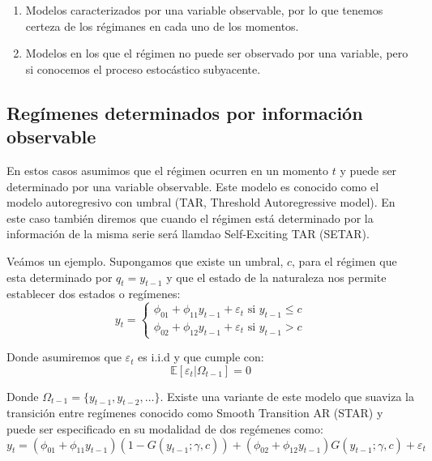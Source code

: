 \documentclass[
]{book}
\begin{document}
\begin{enumerate}
    \item Modelos caracterizados por una variable observable, por lo que tenemos certeza de los régimanes en cada uno de los momentos.
    
    \item Modelos en los que el régimen no puede ser observado por una variable, pero si conocemos el proceso estocástico subyacente. 
\end{enumerate}

\hypertarget{reguxedmenes-determinados-por-informaciuxf3n-observable}{%
\subsection{Regímenes determinados por información observable}\label{reguxedmenes-determinados-por-informaciuxf3n-observable}}

En estos casos asumimos que el régimen ocurren en un momento \(t\) y puede ser determinado por una variable observable. Este modelo es conocido como el modelo autoregresivo con umbral (TAR, Threshold Autoregressive model). En este caso también diremos que cuando el régimen está determinado por la información de la misma serie será llamdao Self-Exciting TAR (SETAR).

Veámos un ejemplo. Supongamos que existe un umbral, \(c\), para el régimen que esta determinado por \(q_t = y_{t-1}\) y que el estado de la naturaleza nos permite establecer dos estados o regímenes:
\begin{equation}
    y_t = 
    \begin{cases}
        \phi_{01} + \phi_{11} y_{t-1} + \varepsilon_t \text{ si } y_{t-1} \leq c \\
        \phi_{02} + \phi_{12} y_{t-1} + \varepsilon_t \text{ si } y_{t-1} > c 
    \end{cases}
\end{equation}

Donde asumiremos que \(\varepsilon_t\) es i.i.d y que cumple con:
\begin{equation*}
    \mathbb{E}[\varepsilon_t | \Omega_{t-1}] = 0
\end{equation*}

Donde \(\Omega_{t-1} = \{ y_{t-1}, y_{t-2}, \ldots \}\). Existe una variante de este modelo que suaviza la transición entre regímenes conocido como Smooth Transition AR (STAR) y puede ser especificado en su modalidad de dos regémenes como:
\begin{equation}
    y_t = (\phi_{01} + \phi_{11} y_{t-1}) (1 - G(y_{t-1}; \gamma, c)) + (\phi_{02} + \phi_{12} y_{t-1}) G(y_{t-1}; \gamma, c) + \varepsilon_t
\end{equation}
\end{document}
